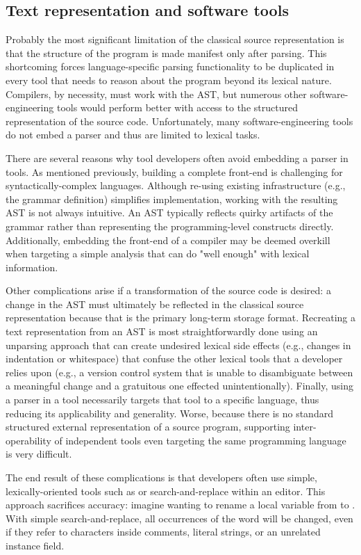 \documentclass{article}
\begin{document}
\subsection{Text representation and software tools}

Probably the most significant limitation of the classical source
representation is that the structure of the program is made manifest
only after parsing.  This shortcoming forces language-specific parsing
functionality to be duplicated in every tool that needs to reason about
the program beyond its lexical nature.  Compilers, by necessity, must
work with the AST, but numerous other software-engineering tools would
perform better with access to the structured representation of the
source code.  Unfortunately, many software-engineering tools do not
embed a parser and thus are limited to lexical tasks.

There are several reasons why tool developers often avoid embedding a
parser in tools.  As mentioned previously, building a complete front-end
is challenging for syntactically-complex languages.  Although re-using
existing infrastructure (e.g., the grammar definition) simplifies
implementation, working with the resulting AST is not always intuitive.
An AST typically reflects quirky artifacts of the grammar rather than
representing the programming-level constructs directly.  Additionally,
embedding the front-end of a compiler may be deemed overkill when
targeting a simple analysis that can do "well enough" with lexical
information.

Other complications arise if a transformation of the source code is
desired: a change in the AST must ultimately be reflected in the
classical source representation because that is the primary long-term
storage format.  Recreating a text representation from an AST is most
straightforwardly done using an unparsing approach that can create
undesired lexical side effects (e.g., changes in indentation or
whitespace) that confuse the other lexical tools that a developer relies
upon (e.g., a version control system that is unable to disambiguate
between a meaningful change and a gratuitous one effected
unintentionally).  Finally, using a parser in a tool necessarily targets
that tool to a specific language, thus reducing its applicability and
generality.  Worse, because there is no standard structured external
representation of a source program, supporting inter-operability of
independent tools even targeting the same programming language is very
difficult.

The end result of these complications is that developers often use
simple, lexically-oriented tools such as  or
search-and-replace within an editor.  This approach sacrifices accuracy:
imagine wanting to rename a local variable from  to
.  With simple search-and-replace, all occurrences of
the word will be changed, even if they refer to characters inside
comments, literal strings, or an unrelated instance field.
\end{document}
